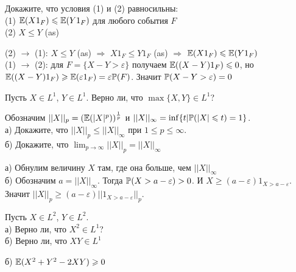 \begin{problem}
Докажите, что условия (1) и (2) равносильны: \\
(1) $\E(X 1_{F})\le \E(Y 1_{F})$ для любого события $F$ \\
(2) $X\le Y$ (as)

\begin{sol}


(2) $\rightarrow$ (1): $X\le Y$ (as) $\Rightarrow$ $X 1_{F}\le Y
1_{F}$ (as) $\Rightarrow$ $\E(X 1_{F})\le \E(Y 1_{F})$ \\
(1) $\rightarrow$ (2): для $F=\{X-Y>\varepsilon\}$ получаем
$\E((X-Y) 1_{F})\le
 0$, но $\E((X-Y) 1_{F})\ge \E(\varepsilon 1_{F})=\varepsilon \P(F)$.
Значит $\P(X-Y>\varepsilon)=0$
\end{sol}
\end{problem}

\begin{problem}
Пусть $X\in L^{1}$, $Y\in L^{1}$. Верно ли, что $\max\{X,Y\}\in
L^{1}$?

\begin{sol}

\end{sol}
\end{problem}

\begin{problem}
\label{L beskonechnost} Обозначим
$||X||_{p}=(\E(|X|^{p}))^{\frac{1}{p}}$ и
$||X||_{\infty}=\inf\{t|\P(|X|\le t)=1\}$. \\
а) Докажите, что $||X||_{p}\le ||X||_{\infty}$ при $1\le p\le
\infty$. \\
б) Докажите, что $\lim_{p\to\infty}||X||_{p}=||X||_{\infty}$

\begin{sol}

а) Обнулим величину $X$ там, где она больше, чем $||X||_{\infty}$ \\
б) Обозначим $a=||X||_{\infty}$. Тогда $\P(X>a-\varepsilon)>0$. И
$X\ge (a-\varepsilon)1_{X>a-\varepsilon}$. Значит $||X||_{p}\ge
(a-\varepsilon)||1_{X>a-\varepsilon}||_{p}$.
\end{sol}
\end{problem}

\begin{problem}
\label{X2Y2XY} Пусть $X\in L^{2}$, $Y\in L^{2}$. \\
а) Верно ли, что $X^{2}\in L^{1}$? \\
б) Верно ли, что $XY\in L^{1}$

\begin{sol}

б) $\E(X^{2}+Y^{2}-2XY)\ge 0$
\end{sol}
\end{problem}

